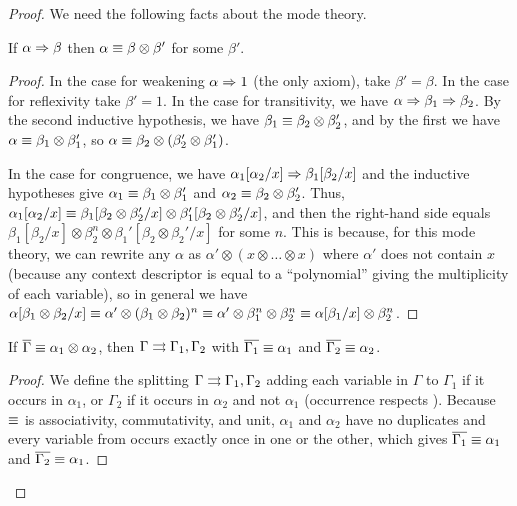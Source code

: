 \begin{proof}
We need the following facts about the mode theory.  

\begin{lemma} \label{lem:affine-mode-1}
If $\alpha \Rightarrow \beta$ then $\alpha \equiv \beta \otimes \beta'$
for some $\beta'$.
\end{lemma}
\begin{proof}

In the case for weakening $\alpha \Rightarrow 1$ (the only axiom), take
$\beta' = \beta$.  In the case for reflexivity take $\beta' =
1$.  In the case for transitivity, we have $\alpha \Rightarrow \beta_1
\Rightarrow \beta_2$.  By the second inductive hypothesis, we have
$\beta_1 \equiv \beta_2 \otimes \beta_2'$, and by the first we have
$\alpha \equiv \beta_1 \otimes \beta_1'$, so 
$\alpha \equiv \beta_2 \otimes (\beta_2' \otimes \beta_1')$.  

In the case for congruence, we have
$\alpha_1[\alpha_2/x] \Rightarrow \beta_1[\beta_2/x]$
and the inductive hypotheses give
    $\alpha_1 \equiv \beta_1 \otimes \beta_1'$
and $\alpha_2 \equiv \beta_2 \otimes \beta_2'$.  
Thus, 
$\alpha_1[\alpha_2/x] \equiv \beta_1[\beta_2 \otimes \beta_2'/x] \otimes \beta_1'[\beta_2 \otimes \beta_2'/x]$,
and then the right-hand side equals 
$\beta_1[\beta_2/x] \otimes \beta_2^n \otimes \beta_1'[\beta_2 \otimes \beta_2'/x]$
for some $n$.  
This is because, 
for this mode theory, we can rewrite any $\alpha$ as $\alpha' \otimes (x
\otimes \ldots \otimes x)$ where $\alpha'$ does not contain $x$ (because
any context descriptor is equal to a ``polynomial'' giving the
multiplicity of each variable), so in general we have $\alpha[\beta_1
  \otimes \beta_2/x] \equiv \alpha' \otimes (\beta_1 \otimes \beta_2)^n
\equiv \alpha' \otimes \beta_1^n \otimes \beta_2^n \equiv \alpha[\beta_1/x]
\otimes \beta_2^n$.
\end{proof}

\begin{lemma} \label{lem:affine-mode-5}
If $\overline{\Gamma} \equiv \alpha_1 \otimes \alpha_2$, 
then $\Gamma \rightrightarrows \Gamma_1,\Gamma_2$ with 
$\overline{\Gamma_1} \equiv \alpha_1$ 
and $\overline{\Gamma_2} \equiv \alpha_2$.  
\end{lemma}
\begin{proof}
We define the splitting $\Gamma \rightrightarrows \Gamma_1,\Gamma_2$ adding each
variable in $\Gamma$ to $\Gamma_1$ if it occurs in $\alpha_1$, or
$\Gamma_2$ if it occurs in $\alpha_2$ and not $\alpha_1$ (occurrence
respects \deq).  Because $\equiv$ is associativity, commutativity, and
unit, $\alpha_1$ and $\alpha_2$ have no duplicates and every variable
from \vars{\Gamma} occurs exactly once in one or the other, which gives
$\overline{\Gamma_1} \equiv \alpha_1$ and $\overline{\Gamma_2} \equiv \alpha_1$.
\end{proof}


\end{proof}
